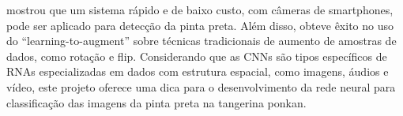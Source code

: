 \textcite{Momeny2022} mostrou que um sistema rápido e de baixo custo, com câmeras de smartphones, pode ser aplicado para detecção da pinta preta. Além disso, obteve êxito no uso do “learning-to-augment” sobre técnicas tradicionais de aumento de amostras de dados, como rotação e flip. Considerando que as CNNs são tipos específicos de RNAs especializadas em dados com estrutura espacial, como imagens, áudios e vídeo, este projeto oferece uma dica para o desenvolvimento da rede neural para classificação das imagens da pinta preta na tangerina ponkan. 
